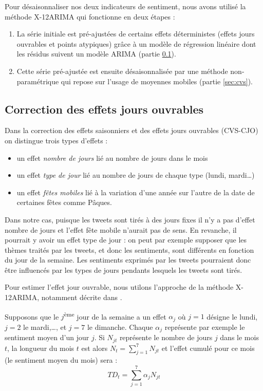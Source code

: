 \documentclass[11pt,french,french]{article}
\begin{document}
Pour désaisonnaliser nos deux indicateurs de sentiment, nous avons utilisé la méthode X-12ARIMA qui fonctionne en deux étapes :

\begin{enumerate}
\def\labelenumi{\arabic{enumi}.}
\item
  La série initiale est pré-ajustées de certains effets déterministes (effets jours ouvrables et points atypiques) grâce à un modèle de régression linéaire dont les résidus suivent un modèle ARIMA (partie \ref{sec:cjo}).
\item
  Cette série pré-ajustée est ensuite désaisonnalisée par une méthode non-paramétrique qui repose sur l'usage de moyennes mobiles (partie \ref{sec:cvs}).
\end{enumerate}

\hypertarget{sec:cjo}{%
\subsection{Correction des effets jours ouvrables}\label{sec:cjo}}

Dans la correction des effets saisonniers et des effets jours ouvrables (CVS-CJO) on distingue trois types d'effets :

\begin{itemize}
\item
  un effet \emph{nombre de jours} lié au nombre de jours dans le mois
\item
  un effet \emph{type de jour} lié au nombre de jours de chaque type (lundi, mardi\dots)
\item
  un effet \emph{fêtes mobiles} lié à la variation d'une année sur l'autre de la date de certaines fêtes comme Pâques.
\end{itemize}

Dans notre cas, puisque les tweets sont tirés à des jours fixes il n'y a pas d'effet nombre de jours et l'effet fête mobile n'aurait pas de sens.
En revanche, il pourrait y avoir un effet type de jour : on peut par exemple supposer que les thèmes traités par les tweets, et donc les sentiments, sont différents en fonction du jour de la semaine.
Les sentiments exprimés par les tweets pourraient donc être influencés par les types de jours pendants lesquels les tweets sont tirés.

Pour estimer l'effet jour ouvrable, nous utilons l'approche de la méthode X-12ARIMA, notamment décrite dans \cite{L2018}.

Supposons que le \(j\)\textsuperscript{ème} jour de la semaine a un effet \(\alpha_j\) où \(j=1\) désigne le lundi, \(j=2\) le mardi,\dots, et \(j=7\) le dimanche.
Chaque \(\alpha_j\) représente par exemple le sentiment moyen d'un jour \(j\).
Si \(N_{jt}\) représente le nombre de jours \(j\) dans le mois \(t\), la longueur du mois \(t\) est alors \(N_t = \sum_{j=1}^{7} N_{jt}\) et l'effet cumulé pour ce mois (le sentiment moyen du mois) sera :
\[
TD_t = \sum_{j=1}^{7} \alpha_j N_{jt}
\]
\end{document}
